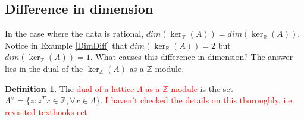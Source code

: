 \documentclass{article}
\newcommand{\Z}[0]{\mathbb{Z}}		%
\newcommand{\R}[0]{\mathbb{R}}		%
\newtheorem{thm}{Theorem}[section]
\theoremstyle{definition}
\newtheorem{defn}[thm]{Definition}
\theoremstyle{remark}
\begin{document}
\subsection{Difference in dimension}
In the case where the data is rational, $dim(\ker_\Z(A)) = dim(\ker_\R(A))$. Notice in Example \ref{DimDiff} that $dim(\ker_\R(A))=2$ but $dim(\ker_\Z(A))=1$. What causes this difference in dimension?  The answer lies in the dual of the $\ker_\Z(A)$ as a $\Z$-module. 
\begin{defn}
The \textcolor{red}{ dual of a lattice $\Lambda$ as a $\Z$-module} is the set $\Lambda^\vee = \{ z: z^Tx \in \Z ,\forall x \in \Lambda\} $. \textcolor{red}{I haven't checked the details on this thoroughly, i.e. revisited textbooks ect} %
\end{defn}



\end{document}

